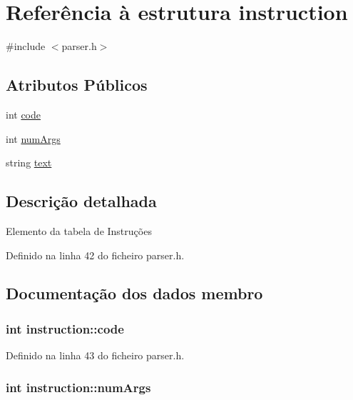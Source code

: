 \hypertarget{structinstruction}{\section{Referência à estrutura instruction}
\label{structinstruction}
}


{\ttfamily \#include $<$parser.\-h$>$}

\subsection*{Atributos Públicos}
\begin{DoxyCompactItemize}
\item 
int \hyperlink{structinstruction_a20ba1219d473773f35384214c08f717c}{code}
\item 
int \hyperlink{structinstruction_abb5712c98f149b197b5c58b2dac15a03}{num\-Args}
\item 
string \hyperlink{structinstruction_af31af10ecfe7d2fdf154616d0aede8ea}{text}
\end{DoxyCompactItemize}


\subsection{Descrição detalhada}
Elemento da tabela de Instruções 

Definido na linha 42 do ficheiro parser.\-h.



\subsection{Documentação dos dados membro}
\hypertarget{structinstruction_a20ba1219d473773f35384214c08f717c}{
\subsubsection[{code}]{\setlength{\rightskip}{0pt plus 5cm}int instruction\-::code}}\label{structinstruction_a20ba1219d473773f35384214c08f717c}


Definido na linha 43 do ficheiro parser.\-h.

\hypertarget{structinstruction_abb5712c98f149b197b5c58b2dac15a03}{
\subsubsection[{num\-Args}]{\setlength{\rightskip}{0pt plus 5cm}int instruction\-::num\-Args}}\label{structinstruction_abb5712c98f149b197b5c58b2dac15a03}


